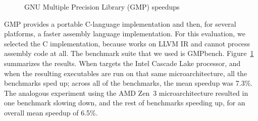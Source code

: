 \begin{figure}[tbp]
  \centering
  \hfill
  \caption{GNU Multiple Precision Library (GMP) speedups}
  \label{fig:gmp}
\end{figure}


GMP provides a portable C-language implementation and then, for
several platforms, a faster assembly language implementation.
%
For this evaluation, we selected the C implementation, because \minotaur{}
works on LLVM IR and cannot process assembly code at all.
%
The benchmark suite that we used is
GMPbench.%
%
Figure~\ref{fig:gmp} summarizes the results.
%
When \minotaur{} targets the Intel Cascade Lake processor, and when the
resulting executables are run on that same microarchitecture,
all the benchmarks sped up;
across all of the benchmarks, the mean speedup was 7.3\%.
%
The analogous experiment using the AMD Zen~3 microarchitecture
resulted in one benchmark slowing down, and the rest of benchmarks
speeding up, for an overall mean speedup of 6.5\%.


